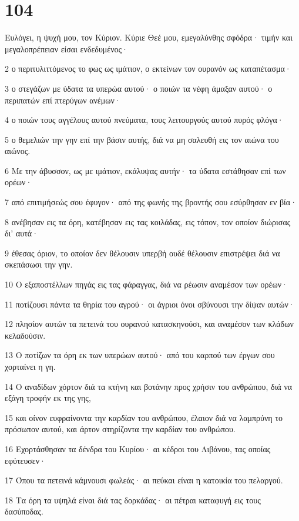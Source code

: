 \chapter{104}

\par Ευλόγει, η ψυχή μου, τον Κύριον. Κύριε Θεέ μου, εμεγαλύνθης σφόδρα· τιμήν και μεγαλοπρέπειαν είσαι ενδεδυμένος·
\par 2 ο περιτυλιττόμενος το φως ως ιμάτιον, ο εκτείνων τον ουρανόν ως καταπέτασμα·
\par 3 ο στεγάζων με ύδατα τα υπερώα αυτού· ο ποιών τα νέφη άμαξαν αυτού· ο περιπατών επί πτερύγων ανέμων·
\par 4 ο ποιών τους αγγέλους αυτού πνεύματα, τους λειτουργούς αυτού πυρός φλόγα·
\par 5 ο θεμελιών την γην επί την βάσιν αυτής, διά να μη σαλευθή εις τον αιώνα του αιώνος.
\par 6 Με την άβυσσον, ως με ιμάτιον, εκάλυψας αυτήν· τα ύδατα εστάθησαν επί των ορέων·
\par 7 από επιτιμήσεώς σου έφυγον· από της φωνής της βροντής σου εσύρθησαν εν βία·
\par 8 ανέβησαν εις τα όρη, κατέβησαν εις τας κοιλάδας, εις τόπον, τον οποίον διώρισας δι' αυτά·
\par 9 έθεσας όριον, το οποίον δεν θέλουσιν υπερβή ουδέ θέλουσιν επιστρέψει διά να σκεπάσωσι την γην.
\par 10 Ο εξαποστέλλων πηγάς εις τας φάραγγας, διά να ρέωσιν αναμέσον των ορέων·
\par 11 ποτίζουσι πάντα τα θηρία του αγρού· οι άγριοι όνοι σβύνουσι την δίψαν αυτών·
\par 12 πλησίον αυτών τα πετεινά του ουρανού κατασκηνούσι, και αναμέσον των κλάδων κελαδούσιν.
\par 13 Ο ποτίζων τα όρη εκ των υπερώων αυτού· από του καρπού των έργων σου χορταίνει η γη.
\par 14 Ο αναδίδων χόρτον διά τα κτήνη και βοτάνην προς χρήσιν του ανθρώπου, διά να εξάγη τροφήν εκ της γης,
\par 15 και οίνον ευφραίνοντα την καρδίαν του ανθρώπου, έλαιον διά να λαμπρύνη το πρόσωπον αυτού, και άρτον στηρίζοντα την καρδίαν του ανθρώπου.
\par 16 Εχορτάσθησαν τα δένδρα του Κυρίου· αι κέδροι του Λιβάνου, τας οποίας εφύτευσεν·
\par 17 Όπου τα πετεινά κάμνουσι φωλεάς· αι πεύκαι είναι η κατοικία του πελαργού.
\par 18 Τα όρη τα υψηλά είναι διά τας δορκάδας· αι πέτραι καταφυγή εις τους δασύποδας.
